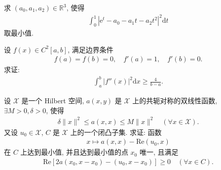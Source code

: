 \documentclass[../../main.tex]{subfiles}%
\begin{document}
\begin{example}
求 $(a_0,a_1,a_2)\in\mathbb{R}^3$, 使得
\begin{align*}
\int_0^1|\mathrm{e}^t-a_0-a_1t-a_2t^2|^2\mathrm{d}t
\end{align*}
取最小值.
\end{example}

\begin{example}
设 $f(x)\in C^2[a,b]$, 满足边界条件
\begin{align*}
f(a)=f(b)=0,\quad f'(a)=1,\quad f'(b)=0.
\end{align*}
求证:
\begin{align*}
\int_a^b|f''(x)|^2\mathrm{d}x\geqslant\frac{4}{b-a}.
\end{align*}
\end{example}

\begin{proposition}[变分不等式]
设 $\mathscr{X}$ 是一个 Hilbert 空间, $a(x,y)$ 是 $\mathscr{X}$ 上的共轭对称的双线性函数, $\exists M>0,\delta>0$, 使得
\begin{align*}
\delta\|x\|^2\leqslant a(x,x)\leqslant M\|x\|^2\quad(\forall x\in\mathscr{X}).
\end{align*}
又设 $u_0\in\mathscr{X}$, $C$ 是 $\mathscr{X}$ 上的一个闭凸子集. 求证: 函数
\begin{align*}
x\mapsto a(x,x)-\text{Re}(u_0,x)
\end{align*}
在 $C$ 上达到最小值, 并且达到最小值的点 $x_0$ 唯一, 且满足
\begin{align*}
\text{Re}\left[2a(x_0,x-x_0)-(u_0,x-x_0)\right]\geqslant 0\quad(\forall x\in C).
\end{align*}
\end{proposition}
\end{document}
